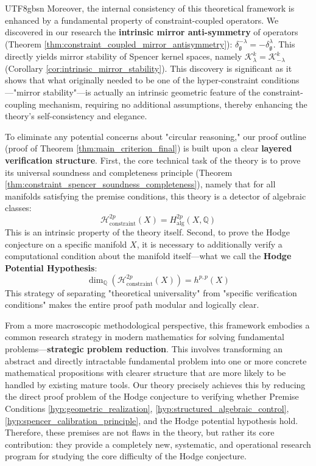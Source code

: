 \documentclass[a4paper,12pt]{extarticle}
\theoremstyle{definition}
\begin{document}
\begin{CJK}{UTF8}{gbsn}
Moreover, the internal consistency of this theoretical framework is enhanced by a fundamental property of constraint-coupled operators. We discovered in our research the \textbf{intrinsic mirror anti-symmetry} of operators (Theorem \ref{thm:constraint_coupled_mirror_antisymmetry}): $\delta^{-\lambda}_\mathfrak{g} = -\delta^\lambda_\mathfrak{g}$. This directly yields mirror stability of Spencer kernel spaces, namely $\mathcal{K}^k_\lambda = \mathcal{K}^k_{-\lambda}$ (Corollary \ref{cor:intrinsic_mirror_stability}). This discovery is significant as it shows that what originally needed to be one of the hyper-constraint conditions—"mirror stability"—is actually an intrinsic geometric feature of the constraint-coupling mechanism, requiring no additional assumptions, thereby enhancing the theory's self-consistency and elegance.

To eliminate any potential concerns about "circular reasoning," our proof outline (proof of Theorem \ref{thm:main_criterion_final}) is built upon a clear \textbf{layered verification structure}. First, the core technical task of the theory is to prove its universal soundness and completeness principle (Theorem \ref{thm:constraint_spencer_soundness_completeness}), namely that for all manifolds satisfying the premise conditions, this theory is a detector of algebraic classes:
\begin{equation}
\mathcal{H}_{\text{constraint}}^{2p}(X) = H_{\text{alg}}^{2p}(X, \mathbb{Q})
\end{equation}
This is an intrinsic property of the theory itself. Second, to prove the Hodge conjecture on a specific manifold $X$, it is necessary to additionally verify a computational condition about the manifold itself—what we call the \textbf{Hodge Potential Hypothesis}:
\begin{equation}
\dim_{\mathbb{Q}}(\mathcal{H}_{\text{constraint}}^{2p}(X)) = h^{p,p}(X)
\end{equation}
This strategy of separating "theoretical universality" from "specific verification conditions" makes the entire proof path modular and logically clear.

From a more macroscopic methodological perspective, this framework embodies a common research strategy in modern mathematics for solving fundamental problems—\textbf{strategic problem reduction}. This involves transforming an abstract and directly intractable fundamental problem into one or more concrete mathematical propositions with clearer structure that are more likely to be handled by existing mature tools. Our theory precisely achieves this by reducing the direct proof problem of the Hodge conjecture to verifying whether Premise Conditions \ref{hyp:geometric_realization}, \ref{hyp:structured_algebraic_control}, \ref{hyp:spencer_calibration_principle}, and the Hodge potential hypothesis hold. Therefore, these premises are not flaws in the theory, but rather its core contribution: they provide a completely new, systematic, and operational research program for studying the core difficulty of the Hodge conjecture.


\end{CJK}
\end{document}
